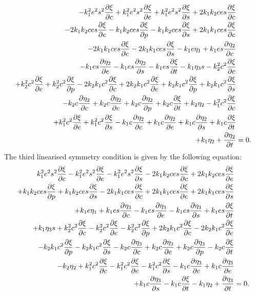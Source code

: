 \begin{align}
  - k_{1}^{2} e^{2} s^{2} \pdv{\xi}{c} + k_{1}^{2} e^{2} s^{2} \pdv{\xi}{e} + k_{1}^{2} e^{2} s^{2} \pdv{\xi}{s} + 2 k_{1} k_{2} c e s \pdv{\xi}{c}&\nonumber\\
  - 2 k_{1} k_{2} c e s \pdv{\xi}{e} - k_{1} k_{2} c e s \pdv{\xi}{p} - k_{1} k_{2} c e s \pdv{\xi}{s} + 2 k_{1} k_{1} c e s \pdv{\xi}{c}&\nonumber\\
  - 2 k_{1} k_{1} c e s \pdv{\xi}{e} - 2 k_{1} k_{1} c e s \pdv{\xi}{s} - k_{1} e \eta_1 + k_{1} e s \pdv{\eta_2}{c}&\nonumber\\
  - k_{1} e s \pdv{\eta_2}{e} - k_{1} e s \pdv{\eta_2}{s} - k_{1} e s \pdv{\xi}{t} - k_{1} \eta_3 s - k_{2}^{2} c^{2} \pdv{\xi}{c} &\nonumber\\
  + k_{2}^{2} c^{2} \pdv{\xi}{e} + k_{2}^{2} c^{2} \pdv{\xi}{p} - 2 k_{2} k_{1} c^{2} \pdv{\xi}{c} + 2 k_{2} k_{1} c^{2} \pdv{\xi}{e} + k_{2} k_{1} c^{2} \pdv{\xi}{p} + k_{2} k_{1} c^{2} \pdv{\xi}{s}&\nonumber\\
  - k_{2} c \pdv{\eta_2}{c} + k_{2} c \pdv{\eta_2}{e} + k_{2} c \pdv{\eta_2}{p} + k_{2} c \pdv{\xi}{t} + k_{2} \eta_2 - k_{1}^{2} c^{2} \pdv{\xi}{c}&\nonumber\\
  + k_{1}^{2} c^{2} \pdv{\xi}{e} + k_{1}^{2} c^{2} \pdv{\xi}{s} - k_{1} c \pdv{\eta_2}{c} + k_{1} c \pdv{\eta_2}{e} + k_{1} c \pdv{\eta_2}{s} + k_{1} c \pdv{\xi}{t}&\nonumber\\
  + k_{1} \eta_2 + \pdv{\eta_2}{t}&=0.\label{eq:MM_lin_sym_2}
\end{align}
The third linearised symmetry condition is given by the following equation:
\begin{align}
  k_{1}^{2} e^{2} s^{2} \pdv{\xi}{c} - k_{1}^{2} e^{2} s^{2} \pdv{\xi}{e} - k_{1}^{2} e^{2} s^{2} \pdv{\xi}{s} - 2 k_{1} k_{2} c e s \pdv{\xi}{c} + 2 k_{1} k_{2} c e s \pdv{\xi}{e}&\nonumber\\
  + k_{1} k_{2} c e s \pdv{\xi}{p} + k_{1} k_{2} c e s \pdv{\xi}{s} - 2 k_{1} k_{1} c e s \pdv{\xi}{c} + 2 k_{1} k_{1} c e s \pdv{\xi}{e} + 2 k_{1} k_{1} c e s \pdv{\xi}{s} &\nonumber\\
  + k_{1} e \eta_1 + k_{1} e s \pdv{\eta_3}{c} - k_{1} e s \pdv{\eta_3}{e} - k_{1} e s \pdv{\eta_3}{s} + k_{1} e s \pdv{\xi}{t}&\nonumber\\
  + k_{1} \eta_3 s + k_{2}^{2} c^{2} \pdv{\xi}{c} - k_{2}^{2} c^{2} \pdv{\xi}{e} - k_{2}^{2} c^{2} \pdv{\xi}{p} + 2 k_{2} k_{1} c^{2} \pdv{\xi}{c} - 2 k_{2} k_{1} c^{2} \pdv{\xi}{e}&\nonumber\\
  - k_{2} k_{1} c^{2} \pdv{\xi}{p} - k_{2} k_{1} c^{2} \pdv{\xi}{s} - k_{2} c \pdv{\eta_3}{c} + k_{2} c \pdv{\eta_3}{e} + k_{2} c \pdv{\eta_3}{p} - k_{2} c \pdv{\xi}{t} &\nonumber\\
  - k_{2} \eta_2 + k_{1}^{2} c^{2} \pdv{\xi}{c} - k_{1}^{2} c^{2} \pdv{\xi}{e} - k_{1}^{2} c^{2} \pdv{\xi}{s} - k_{1} c \pdv{\eta_3}{c} + k_{1} c \pdv{\eta_3}{e}&\nonumber\\
  + k_{1} c \pdv{\eta_3}{s} - k_{1} c \pdv{\xi}{t} - k_{1} \eta_2 + \pdv{\eta_3}{t}&=0.\label{eq:MM_lin_sym_3}
\end{align}
